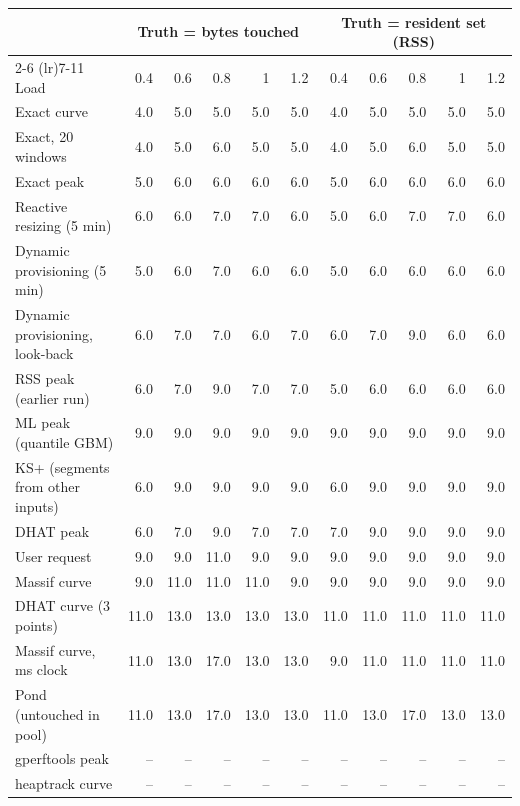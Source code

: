 \begin{tabular}{lrrrrrrrrrr}
\toprule
 & \multicolumn{5}{c}{Truth = bytes touched} & \multicolumn{5}{c}{Truth = resident set (RSS)} \\
\cmidrule(lr){2-6} \cmidrule(lr){7-11}
Load & 0.4 & 0.6 & 0.8 & 1 & 1.2 & 0.4 & 0.6 & 0.8 & 1 & 1.2 \\
\midrule
Exact curve & 4.0 & 5.0 & 5.0 & 5.0 & 5.0 & 4.0 & 5.0 & 5.0 & 5.0 & 5.0 \\
Exact, 20 windows & 4.0 & 5.0 & 6.0 & 5.0 & 5.0 & 4.0 & 5.0 & 6.0 & 5.0 & 5.0 \\
Exact peak & 5.0 & 6.0 & 6.0 & 6.0 & 6.0 & 5.0 & 6.0 & 6.0 & 6.0 & 6.0 \\
Reactive resizing (5 min) & 6.0 & 6.0 & 7.0 & 7.0 & 6.0 & 5.0 & 6.0 & 7.0 & 7.0 & 6.0 \\
Dynamic provisioning (5 min) & 5.0 & 6.0 & 7.0 & 6.0 & 6.0 & 5.0 & 6.0 & 6.0 & 6.0 & 6.0 \\
Dynamic provisioning, look-back & 6.0 & 7.0 & 7.0 & 6.0 & 7.0 & 6.0 & 7.0 & 9.0 & 6.0 & 6.0 \\
RSS peak (earlier run) & 6.0 & 7.0 & 9.0 & 7.0 & 7.0 & 5.0 & 6.0 & 6.0 & 6.0 & 6.0 \\
ML peak (quantile GBM) & 9.0 & 9.0 & 9.0 & 9.0 & 9.0 & 9.0 & 9.0 & 9.0 & 9.0 & 9.0 \\
KS+ (segments from other inputs) & 6.0 & 9.0 & 9.0 & 9.0 & 9.0 & 6.0 & 9.0 & 9.0 & 9.0 & 9.0 \\
DHAT peak & 6.0 & 7.0 & 9.0 & 7.0 & 7.0 & 7.0 & 9.0 & 9.0 & 9.0 & 9.0 \\
User request & 9.0 & 9.0 & 11.0 & 9.0 & 9.0 & 9.0 & 9.0 & 9.0 & 9.0 & 9.0 \\
Massif curve & 9.0 & 11.0 & 11.0 & 11.0 & 9.0 & 9.0 & 9.0 & 9.0 & 9.0 & 9.0 \\
DHAT curve (3 points) & 11.0 & 13.0 & 13.0 & 13.0 & 13.0 & 11.0 & 11.0 & 11.0 & 11.0 & 11.0 \\
Massif curve, ms clock & 11.0 & 13.0 & 17.0 & 13.0 & 13.0 & 9.0 & 11.0 & 11.0 & 11.0 & 11.0 \\
Pond (untouched in pool) & 11.0 & 13.0 & 17.0 & 13.0 & 13.0 & 11.0 & 13.0 & 17.0 & 13.0 & 13.0 \\
gperftools peak & -- & -- & -- & -- & -- & -- & -- & -- & -- & -- \\
heaptrack curve & -- & -- & -- & -- & -- & -- & -- & -- & -- & -- \\
\bottomrule
\end{tabular}

